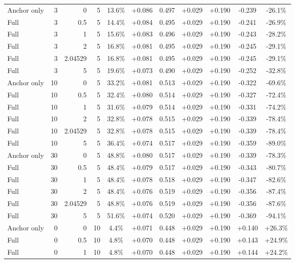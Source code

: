 \begin{table}[htbp]
\begin{tabular}{lrrrccccccc}
Anchor only & 3 & 0 & 5 & 13.6\% & +0.086 & 0.497 & +0.029 & +0.190 & -0.239 & -26.1\% \\
Full & 3 & 0.5 & 5 & 14.4\% & +0.084 & 0.495 & +0.029 & +0.190 & -0.241 & -26.9\% \\
Full & 3 & 1 & 5 & 15.6\% & +0.083 & 0.496 & +0.029 & +0.190 & -0.243 & -28.2\% \\
Full & 3 & 2 & 5 & 16.8\% & +0.081 & 0.495 & +0.029 & +0.190 & -0.245 & -29.1\% \\
Full & 3 & 2.04529 & 5 & 16.8\% & +0.081 & 0.495 & +0.029 & +0.190 & -0.245 & -29.1\% \\
Full & 3 & 5 & 5 & 19.6\% & +0.073 & 0.490 & +0.029 & +0.190 & -0.252 & -32.8\% \\
Anchor only & 10 & 0 & 5 & 33.2\% & +0.081 & 0.513 & +0.029 & +0.190 & -0.322 & -69.6\% \\
Full & 10 & 0.5 & 5 & 32.4\% & +0.080 & 0.514 & +0.029 & +0.190 & -0.327 & -72.4\% \\
Full & 10 & 1 & 5 & 31.6\% & +0.079 & 0.514 & +0.029 & +0.190 & -0.331 & -74.2\% \\
Full & 10 & 2 & 5 & 32.8\% & +0.078 & 0.515 & +0.029 & +0.190 & -0.339 & -78.4\% \\
Full & 10 & 2.04529 & 5 & 32.8\% & +0.078 & 0.515 & +0.029 & +0.190 & -0.339 & -78.4\% \\
Full & 10 & 5 & 5 & 36.4\% & +0.074 & 0.517 & +0.029 & +0.190 & -0.359 & -89.0\% \\
Anchor only & 30 & 0 & 5 & 48.8\% & +0.080 & 0.517 & +0.029 & +0.190 & -0.339 & -78.3\% \\
Full & 30 & 0.5 & 5 & 48.4\% & +0.079 & 0.517 & +0.029 & +0.190 & -0.343 & -80.7\% \\
Full & 30 & 1 & 5 & 48.4\% & +0.078 & 0.518 & +0.029 & +0.190 & -0.347 & -82.6\% \\
Full & 30 & 2 & 5 & 48.4\% & +0.076 & 0.519 & +0.029 & +0.190 & -0.356 & -87.4\% \\
Full & 30 & 2.04529 & 5 & 48.8\% & +0.076 & 0.519 & +0.029 & +0.190 & -0.356 & -87.6\% \\
Full & 30 & 5 & 5 & 51.6\% & +0.074 & 0.520 & +0.029 & +0.190 & -0.369 & -94.1\% \\
Anchor only & 0 & 0 & 10 & 4.4\% & +0.071 & 0.448 & +0.029 & +0.190 & +0.140 & +26.3\% \\
Full & 0 & 0.5 & 10 & 4.8\% & +0.070 & 0.448 & +0.029 & +0.190 & +0.143 & +24.9\% \\
Full & 0 & 1 & 10 & 4.8\% & +0.070 & 0.448 & +0.029 & +0.190 & +0.144 & +24.2\% \\

\end{tabular}
\end{table}
